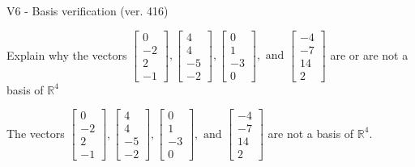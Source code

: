 \begin{exercise}
  \begin{exerciseTitle}V6 - Basis verification (ver. 416)\end{exerciseTitle}
  \begin{exerciseStatement}
    Explain why the vectors \(\left[\begin{array}{r}
0 \\
-2 \\
2 \\
-1
\end{array}\right] , \left[\begin{array}{r}
4 \\
4 \\
-5 \\
-2
\end{array}\right] , \left[\begin{array}{r}
0 \\
1 \\
-3 \\
0
\end{array}\right] , \text{ and } \left[\begin{array}{r}
-4 \\
-7 \\
14 \\
2
\end{array}\right]\) are or are not a basis of \(\mathbb{R}^4\)	


  \end{exerciseStatement}
  \begin{exerciseAnswer}
   The vectors \(\left[\begin{array}{r}
0 \\
-2 \\
2 \\
-1
\end{array}\right] , \left[\begin{array}{r}
4 \\
4 \\
-5 \\
-2
\end{array}\right] , \left[\begin{array}{r}
0 \\
1 \\
-3 \\
0
\end{array}\right] , \text{ and } \left[\begin{array}{r}
-4 \\
-7 \\
14 \\
2
\end{array}\right]\) 
  	 are not  a basis of \(\mathbb{R}^4\).
  


  \end{exerciseAnswer}
\end{exercise}